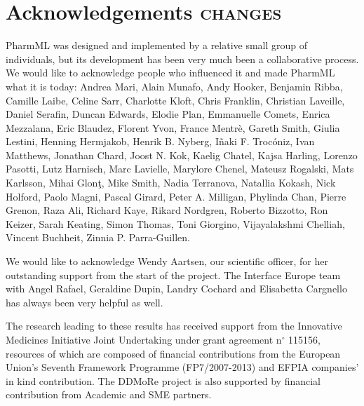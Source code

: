 \chapter*{Acknowledgements  {\color{red} \scshape{changes}}}

PharmML was designed and implemented by a relative small group of individuals, 
but its development has been very much been a collaborative process.
We would like to acknowledge people who influenced it and made PharmML
what it is today: Andrea Mari, Alain Munafo, Andy Hooker, 
Benjamin Ribba, Camille Laibe, Celine Sarr, Charlotte Kloft, Chris Franklin, 
Christian Laveille, Daniel Serafin, Duncan Edwards, Elodie Plan, 
Emmanuelle Comets, Enrica Mezzalana, Eric Blaudez, Florent Yvon, France Mentr\`{e}, 
Gareth Smith, Giulia Lestini, Henning Hermjakob, Henrik B. Nyberg, 
I\~{n}aki F. Troc\'{o}niz, Ivan Matthews, Jonathan Chard, Joost N. Kok, Kaelig Chatel, 
Kajsa Harling, Lorenzo Pasotti, Lutz Harnisch, Marc Lavielle, 
Marylore Chenel, Mateusz Rogalski, Mats Karlsson, Mihai Glon\c{t}, Mike Smith, 
Nadia Terranova, Natallia Kokash, Nick Holford, Paolo Magni, Pascal Girard, Peter A. Milligan, 
Phylinda Chan, Pierre Grenon, Raza Ali, Richard Kaye, Rikard Nordgren, Roberto Bizzotto, 
Ron Keizer, Sarah Keating, Simon Thomas, Toni Giorgino, Vijayalakshmi Chelliah, 
Vincent Buchheit, Zinnia P. Parra-Guillen.

We would like to acknowledge Wendy Aartsen, our scientific officer, for her outstanding support
from the start of the project. The Interface Europe team with  Angel Rafael, Geraldine Dupin, 
Landry Cochard and Elisabetta Cargnello has always been very helpful as well.

The research leading to these results has received support from the Innovative Medicines 
Initiative Joint Undertaking under grant agreement n$^{\circ}$ 115156, resources of which are 
composed of financial contributions from the European Union's Seventh Framework 
Programme (FP7/2007-2013) and EFPIA companies' in kind contribution. The DDMoRe 
project is also supported by financial contribution from Academic and SME partners.